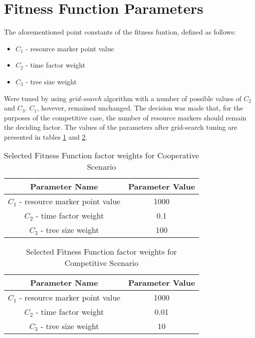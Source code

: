 \section{Fitness Function Parameters}
The aforementioned point constants of the fitness funtion, defined as follows:
\begin{itemize}
    \item $C_1$ - resource marker point value
    \item $C_2$ - time factor weight
    \item $C_3$ - tree size weight
\end{itemize}
Were tuned by using \textit{grid-search} algorithm with a number of possible values of $C_2$ and $C_3$. $C_1$, hovever, remained unchanged. The decision was made that, for the purposes of the competitive case, the number of resource markers should remain the deciding factor.
The values of the parameters after grid-search tuning are presented in tables \ref{table:x tunedfitnessfunctionparameterscoop} and \ref{table:x tunedfitnessfunctionparameterscomp}.
\begin{table} [h]
    \centering
    \begin{tabular} {c c}
        \hline \hline
        Parameter Name & Parameter Value \\
        \hline
        $C_1$ - resource marker point value & 1000 \\
        $C_2$ - time factor weight & 0.1 \\
        $C_3$ - tree size weight & 100 \\
    \end{tabular}
    \caption{Selected Fitness Function factor weights for Cooperative Scenario}
    \label{table:x tunedfitnessfunctionparameterscoop}
\end{table}


\begin{table} [h]
    \centering
    \begin{tabular} {c c}
        \hline \hline
        Parameter Name & Parameter Value \\
        \hline
        $C_1$ - resource marker point value & 1000 \\
        $C_2$ - time factor weight & 0.01 \\
        $C_3$ - tree size weight & 10 \\
    \end{tabular}
    \caption{Selected Fitness Function factor weights for Competitive Scenario}
    \label{table:x tunedfitnessfunctionparameterscomp}
\end{table}
